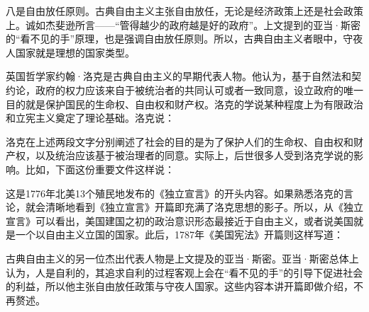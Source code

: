 八是自由放任原则。古典自由主义主张自由放任，无论是经济政策上还是社会政策上。诚如杰斐逊所言——“管得越少的政府越是好的政府”。上文提到的亚当·斯密的“看不见的手”原理，也是强调自由放任原则。所以，古典自由主义者眼中，守夜人国家就是理想的国家类型。


英国哲学家约翰·洛克是古典自由主义的早期代表人物。他认为，基于自然法和契约论，政府的权力应该来自于被统治者的共同认可或者一致同意，设立政府的唯一目的就是保护国民的生命权、自由权和财产权。洛克的学说某种程度上为有限政治和立宪主义奠定了理论基础。洛克说：


洛克在上述两段文字分别阐述了社会的目的是为了保护人们的生命权、自由权和财产权，以及统治应该基于被治理者的同意。实际上，后世很多人受到洛克学说的影响。比如，下面这份重要文件这样说：


这是1776年北美13个殖民地发布的《独立宣言》的开头内容。如果熟悉洛克的言论，就会清晰地看到《独立宣言》开篇即充满了洛克思想的影子。所以，从《独立宣言》可以看出，美国建国之初的政治意识形态最接近于自由主义，或者说美国就是一个以自由主义立国的国家。此后，1787年《美国宪法》开篇则这样写道：


古典自由主义的另一位杰出代表人物是上文提及的亚当·斯密。亚当·斯密总体上认为，人是自利的，其追求自利的过程客观上会在“看不见的手”的引导下促进社会的利益，所以他主张自由放任政策与守夜人国家。这些内容本讲开篇即做介绍，不再赘述。

